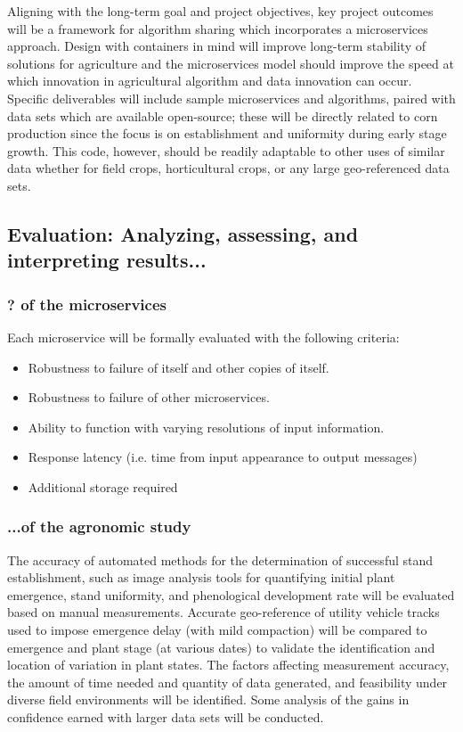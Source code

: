 \documentclass[11pt]{article}
\begin{document}
Aligning with the long-term goal and project objectives, key project outcomes will be a framework for algorithm 
sharing which incorporates a microservices approach. Design with containers in mind will improve long-term 
stability of solutions for agriculture and the microservices model should improve the speed at which innovation 
in agricultural algorithm and data innovation can occur. Specific deliverables will include sample microservices 
and algorithms, paired with data sets which are available open-source; these will be directly related to corn 
production since the focus is on establishment and uniformity during early stage growth. This code, however, 
should be readily adaptable to other uses of similar data whether for field crops, horticultural crops, or 
any large geo-referenced data sets.

\subsection{Evaluation: Analyzing, assessing, and interpreting results...}

\subsubsection{ ? of the microservices}   

Each microservice will be formally evaluated with the following criteria:

\begin{itemize}
\item Robustness to failure of itself and other copies of itself.
\item Robustness to failure of other microservices.
\item Ability to function with varying resolutions of input information.
\item Response latency (i.e. time from input appearance to output messages)
\item Additional storage required
\end{itemize}

\subsubsection{ ...of the agronomic study}   

The accuracy of automated methods for the determination of successful stand establishment, such as image 
analysis tools for quantifying initial plant emergence, stand uniformity, and phenological development rate will 
be evaluated based on manual measurements. Accurate geo-reference of utility vehicle tracks used to impose 
emergence delay (with mild compaction) will be compared to emergence and plant stage (at various dates) to 
validate the identification and location of variation in plant states. The factors affecting measurement accuracy, the 
amount of time needed and quantity of data generated, and feasibility under diverse field environments will be 
identified. Some analysis of the gains in confidence earned with larger data sets will be conducted.
 
\end{document}
